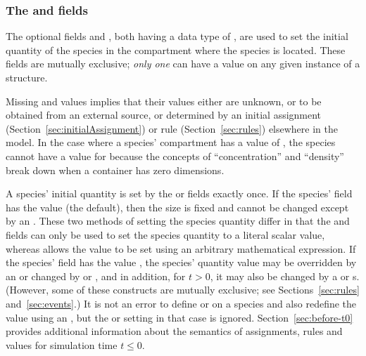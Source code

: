 \subsubsection{The  and
   fields}
\label{sec:initialAmount}

The optional fields  and
, both having a data type of
, are used to set the initial quantity of the
species in the compartment where the species is located.  These
fields are mutually exclusive; \ie \emph{only one} can have a
value on any given instance of a \Species structure.


Missing  and 
values implies that their values either are unknown, or to be
obtained from an external source, or determined by an initial
assignment (Section~\ref{sec:initialAssignment}) or rule
(Section~\ref{sec:rules}) elsewhere in the model.  In the case
where a species' compartment has a  value
of , the species cannot have a value for
 because the concepts of
``concentration'' and ``density'' break down when a container has
zero dimensions.

A species' initial quantity is set by the  or
 fields exactly once.  If the species'
 field has the value  (the default),
then the size is fixed and cannot be changed except by an
\InitialAssignment.  These two methods of setting the species
quantity differ in that the  and
 fields can only be used to set the
species quantity to a literal scalar value, whereas
\InitialAssignment allows the value to be set using an arbitrary
mathematical expression.  If the species'  field
has the value , the species' quantity value may be
overridden by an \InitialAssignment or changed by \AssignmentRule
or \AlgebraicRule, and in addition, for $t > 0$, it may also be
changed by a \RateRule or \Event{}s. (However, some of these
constructs are mutually exclusive; see Sections~\ref{sec:rules}
and~\ref{sec:events}.) It is not an error to define
 or  on a species
and also redefine the value using an \InitialAssignment, but the
 or  setting in
that case is ignored.  Section~\ref{sec:before-t0} provides
additional information about the semantics of assignments, rules
and values for simulation time $t \leq 0$.


